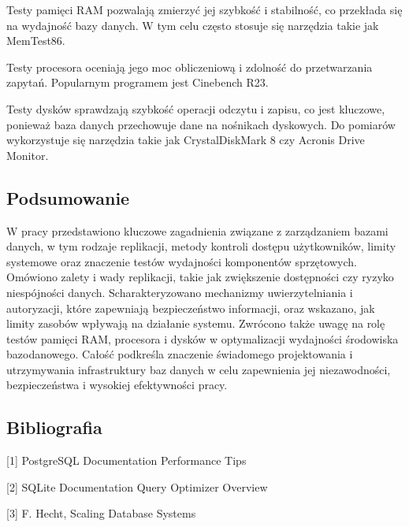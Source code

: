 \documentclass[letterpaper,10pt,polish]{sphinxmanual}
\begin{document}
\sphinxAtStartPar
Testy pamięci RAM pozwalają zmierzyć jej szybkość i stabilność, co przekłada się na wydajność bazy danych. W tym celu często stosuje się narzędzia takie jak MemTest86.

\sphinxAtStartPar
Testy procesora oceniają jego moc obliczeniową i zdolność do przetwarzania zapytań. Popularnym programem jest Cinebench R23.

\sphinxAtStartPar
Testy dysków sprawdzają szybkość operacji odczytu i zapisu, co jest kluczowe, ponieważ baza danych przechowuje dane na nośnikach dyskowych. Do pomiarów wykorzystuje się narzędzia takie jak CrystalDiskMark 8 czy Acronis Drive Monitor.


\subsection{Podsumowanie}
\label{\detokenize{rozdzial2/Wydajnosc_Skalowanie_i_Replikacja/index:podsumowanie}}
\sphinxAtStartPar
W pracy przedstawiono kluczowe zagadnienia związane z zarządzaniem bazami danych, w tym rodzaje replikacji, metody kontroli dostępu użytkowników, limity systemowe oraz znaczenie testów wydajności komponentów sprzętowych. Omówiono zalety i wady replikacji, takie jak zwiększenie dostępności czy ryzyko niespójności danych. Scharakteryzowano mechanizmy uwierzytelniania i autoryzacji, które zapewniają bezpieczeństwo informacji, oraz wskazano, jak limity zasobów wpływają na działanie systemu. Zwrócono także uwagę na rolę testów pamięci RAM, procesora i dysków w optymalizacji wydajności środowiska bazodanowego. Całość podkreśla znaczenie świadomego projektowania i utrzymywania infrastruktury baz danych w celu zapewnienia jej niezawodności, bezpieczeństwa i wysokiej efektywności pracy.


\subsection{Bibliografia}
\label{\detokenize{rozdzial2/Wydajnosc_Skalowanie_i_Replikacja/index:bibliografia}}
\sphinxAtStartPar
{[}1{]} PostgreSQL Documentation \textendash{} Performance Tips

\sphinxAtStartPar
{[}2{]} SQLite Documentation \textendash{} Query Optimizer Overview

\sphinxAtStartPar
{[}3{]} F. Hecht, Scaling Database Systems
\end{document}
